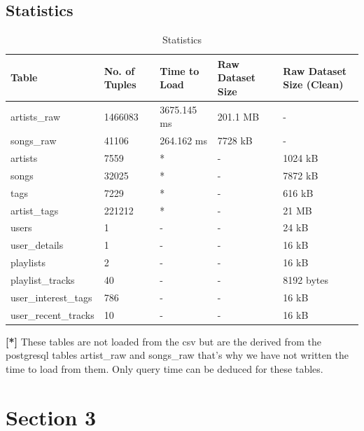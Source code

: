 \documentclass[10pt]{article}
\begin{document}
\begin{itemize}
\begin{itemize}
    \end{itemize}

\end{itemize}
        
\newpage
\subsection{Statistics}
\begin{table}[!ht]
    \centering
    \begin{tabular}{|l|l|l|l|l|}
         \hline
         \textbf{Table} & \textbf{No. of Tuples} & \textbf{Time to Load} & \textbf{Raw Dataset Size} & \textbf{Raw Dataset Size (Clean)}\\
         \hline
         artists\_raw & 1466083 & 3675.145 ms & 201.1 MB & - \\
         \hline
         songs\_raw & 41106 & 264.162 ms & 7728 kB & - \\
         \hline
         artists & 7559 & * & - & 1024 kB \\
         \hline
         songs & 32025 & * & - & 7872 kB \\
         \hline
         tags & 7229 & * & - & 616 kB \\
         \hline
         artist\_tags & 221212 & * & - & 21 MB \\
         \hline
         users & 1 & - & - & 24 kB \\
         \hline
         user\_details & 1 & - & - & 16 kB \\
         \hline
         playlists & 2 & - & - & 16 kB \\
         \hline
         playlist\_tracks & 40 & - & - & 8192 bytes \\
         \hline
         user\_interest\_tags & 786 & - & - & 16 kB \\
         \hline
         user\_recent\_tracks & 10 & - & - & 16 kB \\
         \hline
    \end{tabular}
    \caption{Statistics}
    \label{tab:my_label11}
\end{table}

\textbf{[*]} These tables are not loaded from the csv but are the derived from the postgresql tables artist\_raw and songs\_raw that's why we have not written the time to load from them. Only query time can be deduced for these tables.

\section{Section 3}
\end{document}
